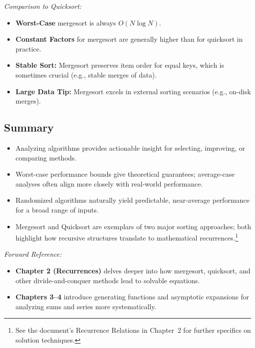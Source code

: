 \documentclass[11pt,letterpaper]{article}
\begin{document}
\noindent
\emph{Comparison to Quicksort:}
\begin{itemize}
  \item \textbf{Worst-Case} mergesort is always \(O(N \log N)\).
  \item \textbf{Constant Factors} for mergesort are generally higher than for quicksort in practice.
  \item \textbf{Stable Sort:} Mergesort preserves item order for equal keys, which is sometimes crucial (e.g., stable merges of data).
  \item \textbf{Large Data Tip:} Mergesort excels in external sorting scenarios (e.g., on-disk merges).
\end{itemize}

\subsection{Summary}
\begin{itemize}
  \item Analyzing algorithms provides actionable insight for selecting, improving, or comparing methods.
  \item Worst-case performance bounds give theoretical guarantees; average-case analyses often align more closely with real-world performance.
  \item Randomized algorithms naturally yield predictable, near-average performance for a broad range of inputs.
  \item Mergesort and Quicksort are exemplars of two major sorting approaches; both highlight how recursive structures translate to mathematical recurrences.\footnote{See the document’s Recurrence Relations in Chapter~2 for further specifics on solution techniques.}
\end{itemize}

\noindent
\emph{Forward Reference:} 
\begin{itemize}
  \item \textbf{Chapter 2 (Recurrences)} delves deeper into how mergesort, quicksort, and other divide-and-conquer methods lead to solvable equations.
  \item \textbf{Chapters 3--4} introduce generating functions and asymptotic expansions for analyzing sums and series more systematically.
\end{itemize}

\clearpage
\end{document}
